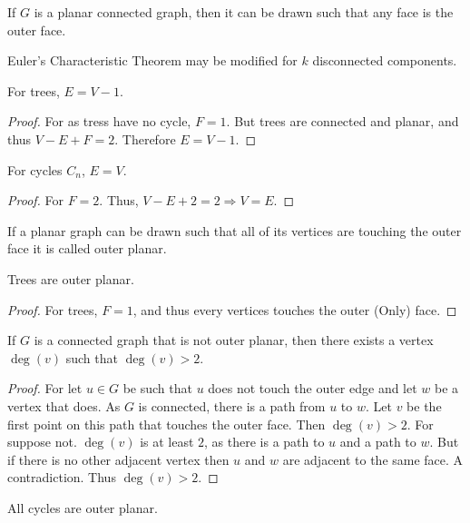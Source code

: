     \begin{theorem}
    If $G$ is a planar connected graph, then it can be drawn such that any face is the outer face.
    \end{theorem}
    \begin{theorem}
    Euler's Characteristic Theorem may be modified for $k$ disconnected components.
    \end{theorem}
    \begin{theorem}
    For trees, $E=V-1$.
    \end{theorem}
    \begin{proof}
    For as tress have no cycle, $F=1$. But trees are connected and planar, and thus $V-E+F = 2$. Therefore $E=V-1$.
    \end{proof}
    \begin{theorem}
    For cycles $C_n$, $E=V$.
    \end{theorem}
    \begin{proof}
    For $F=2$. Thus, $V-E+2=2\Rightarrow V=E$.
    \end{proof}
    \begin{definition}
    If a planar graph can be drawn such that all of its vertices are touching the outer face it is called outer planar.
    \end{definition}
    \begin{theorem}
    Trees are outer planar.
    \end{theorem}
    \begin{proof}
    For trees, $F=1$, and thus every vertices touches the outer (Only) face.
    \end{proof}
    \begin{theorem}
    If $G$ is a connected graph that is not outer planar, then there exists a vertex $\deg(v)$ such that $\deg(v)>2$.
    \end{theorem}
    \begin{proof}
    For let $u \in G$ be such that $u$ does not touch the outer edge and let $w$ be a vertex that does. As $G$ is connected, there is a path from $u$ to $w$. Let $v$ be the first point on this path that touches the outer face. Then $\deg(v)>2$. For suppose not. $\deg(v)$ is at least $2$, as there is a path to $u$ and a path to $w$. But if there is no other adjacent vertex then $u$ and $w$ are adjacent to the same face. A contradiction. Thus $\deg(v)>2$.
    \end{proof}
    \begin{theorem}
    All cycles are outer planar.
    \end{theorem}
